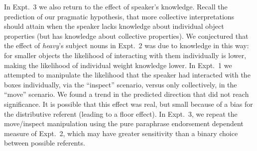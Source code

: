 \documentclass[linguex]{sp}
\begin{document}
In Expt.~3 we also return to the effect of speaker's knowledge. Recall the prediction of our pragmatic hypothesis, that more collective interpretations should attain when the speaker lacks knowledge about individual object properties (but has knowledge about collective properties). We conjectured that the effect of \emph{heavy}'s subject nouns in Expt.~2 was due to knowledge in this way: for smaller objects the likelihood of interacting with them individually is lower, making the likelihood of individual weight knowledge lower.
In Expt.~1 we attempted to manipulate the likelihood that the speaker had interacted with the boxes individually, via the ``inspect'' scenario, versus only collectively, in the ``move'' scenario. We found a trend in the predicted direction that did not reach significance.
It is possible that this effect was real, but small because of a bias for the distributive referent (leading to a floor effect).
In Expt.~3, we repeat the move/inspect manipulation using the pure paraphrase endorsement dependent measure of Expt.~2, which may have greater sensitivity than a binary choice between possible referents.

%
%
%
\end{document}
